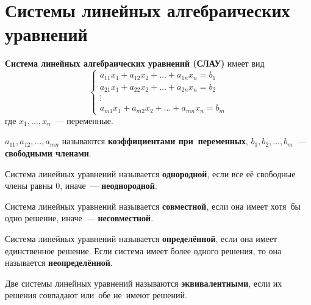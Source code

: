 \section{Системы линейных алгебраических уравнений}
\textbf{Система линейных алгебраических уравнений (СЛАУ)} имеет вид
\begin{equation*}
\begin{cases}
a_{11}x_1 + a_{12}x_2 + \dots + a_{1n}x_n = b_1 \\
a_{21}x_1 + a_{22}x_2 + \dots + a_{2n}x_n = b_2 \\
\vdots \\
a_{m1}x_1 + a_{m2}x_2 + \dots + a_{mn}x_n = b_m
\end{cases}
\end{equation*}
где $x_1, \ldots, x_n$~--- переменные.

$a_{11}, a_{12}, \ldots, a_{mn}$ называются \textbf{коэффициентами при~переменных}, $b_1, b_2, \dots, b_m$~--- \textbf{свободными членами}.

Система линейных уравнений называется \textbf{однородной}, если все её свободные члены равны 0, иначе~--- \textbf{неоднородной}.

Система линейных уравнений называется \textbf{совместной}, если она имеет хотя~бы одно решение, иначе~--- \textbf{несовместной}.

Система линейных уравнений называется \textbf{определённой}, если она имеет единственное решение.
Если система имеет более одного решения, то она называется \textbf{неопределённой}.

Две системы линейных уравнений называются \textbf{эквивалентными}, если их решения совпадают или~обе не~имеют решений.





